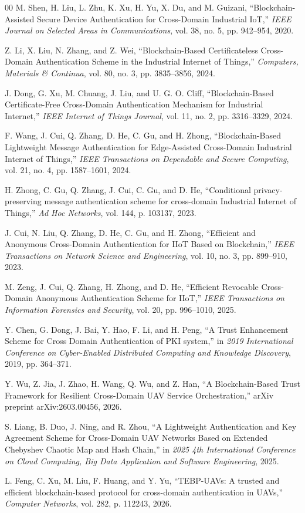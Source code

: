 \documentclass[conference]{IEEEtran}
\begin{document}
\begin{thebibliography}{00}
		 M. Shen, H. Liu, L. Zhu, K. Xu, H. Yu, X. Du, and M. Guizani, ``Blockchain-Assisted Secure Device Authentication for Cross-Domain Industrial IoT,'' \emph{IEEE Journal on Selected Areas in Communications}, vol. 38, no. 5, pp. 942--954, 2020.
		
		 Z. Li, X. Liu, N. Zhang, and Z. Wei, ``Blockchain-Based Certificateless Cross-Domain Authentication Scheme in the Industrial Internet of Things,'' \emph{Computers, Materials \& Continua}, vol. 80, no. 3, pp. 3835--3856, 2024.
		
		 J. Dong, G. Xu, M. Chuang, J. Liu, and U. G. O. Cliff, ``Blockchain-Based Certificate-Free Cross-Domain Authentication Mechanism for Industrial Internet,'' \emph{IEEE Internet of Things Journal}, vol. 11, no. 2, pp. 3316--3329, 2024.
		
		 F. Wang, J. Cui, Q. Zhang, D. He, C. Gu, and H. Zhong, ``Blockchain-Based Lightweight Message Authentication for Edge-Assisted Cross-Domain Industrial Internet of Things,'' \emph{IEEE Transactions on Dependable and Secure Computing}, vol. 21, no. 4, pp. 1587--1601, 2024.
		
		 H. Zhong, C. Gu, Q. Zhang, J. Cui, C. Gu, and D. He, ``Conditional privacy-preserving message authentication scheme for cross-domain Industrial Internet of Things,'' \emph{Ad Hoc Networks}, vol. 144, p. 103137, 2023.
		
		 J. Cui, N. Liu, Q. Zhang, D. He, C. Gu, and H. Zhong, ``Efficient and Anonymous Cross-Domain Authentication for IIoT Based on Blockchain,'' \emph{IEEE Transactions on Network Science and Engineering}, vol. 10, no. 3, pp. 899--910, 2023.
		
		 M. Zeng, J. Cui, Q. Zhang, H. Zhong, and D. He, ``Efficient Revocable Cross-Domain Anonymous Authentication Scheme for IIoT,'' \emph{IEEE Transactions on Information Forensics and Security}, vol. 20, pp. 996--1010, 2025.
		
		 Y. Chen, G. Dong, J. Bai, Y. Hao, F. Li, and H. Peng, ``A Trust Enhancement Scheme for Cross Domain Authentication of PKI system,'' in \emph{2019 International Conference on Cyber-Enabled Distributed Computing and Knowledge Discovery}, 2019, pp. 364--371.
		
		 Y. Wu, Z. Jia, J. Zhao, H. Wang, Q. Wu, and Z. Han, ``A Blockchain-Based Trust Framework for Resilient Cross-Domain UAV Service Orchestration,'' arXiv preprint arXiv:2603.00456, 2026.
		
		 S. Liang, B. Duo, J. Ning, and R. Zhou, ``A Lightweight Authentication and Key Agreement Scheme for Cross-Domain UAV Networks Based on Extended Chebyshev Chaotic Map and Hash Chain,'' in \emph{2025 4th International Conference on Cloud Computing, Big Data Application and Software Engineering}, 2025.
		
		 L. Feng, C. Xu, M. Liu, F. Huang, and Y. Yu, ``TEBP-UAVs: A trusted and efficient blockchain-based protocol for cross-domain authentication in UAVs,'' \emph{Computer Networks}, vol. 282, p. 112243, 2026.
		
	\end{thebibliography}
	
\end{document}
